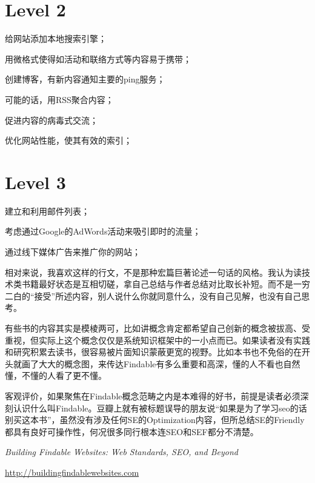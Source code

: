 \documentclass[11pt,adobefonts]{article} %
\begin{document}
\section{Level 2}

\begin{compactenum}
\item 给网站添加本地搜索引擎；
\item 用微格式使得如活动和联络方式等内容易于携带；
\item 创建博客，有新内容通知主要的ping服务；
\item 可能的话，用RSS聚合内容；
\item 促进内容的病毒式交流；
\item 优化网站性能，使其有效的索引；
\end{compactenum}

\section{Level 3}

\begin{compactenum}
\item 建立和利用邮件列表；
\item 考虑通过Google的AdWords活动来吸引即时的流量；
\item 通过线下媒体广告来推广你的网站；
\end{compactenum}

相对来说，我喜欢这样的行文，不是那种宏篇巨著论述一句话的风格。我认为读技术类书籍最好状态是互相切磋，拿自己总结与作者总结对比取长补短。而不是一穷二白的“接受”所述内容，别人说什么你就同意什么，没有自己见解，也没有自己思考。

有些书的内容其实是模棱两可，比如讲概念肯定都希望自己创新的概念被拔高、受重视，但实际上这个概念仅仅是系统知识框架中的一小点而已。如果读者没有实践和研究积累去读书，很容易被片面知识蒙蔽更宽的视野。比如本书也不免俗的在开头就画了大大的概念图，来传达Findable有多么重要和高深，懂的人不看也自然懂，不懂的人看了更不懂。

客观评价，如果聚焦在Findable概念范畴之内是本难得的好书，前提是读者必须深刻认识什么叫Findable。豆瓣上就有被标题误导的朋友说“如果是为了学习seo的话别买这本书”，虽然没有涉及任何SE的Optimization内容，但所总结SE的Friendly都具有良好可操作性，何况很多同行根本连SEO和SEF都分不清楚。

\textsl{Building Findable Websites: Web Standards, SEO, and Beyond}

\url{http://buildingfindablewebsites.com}
\end{document}
